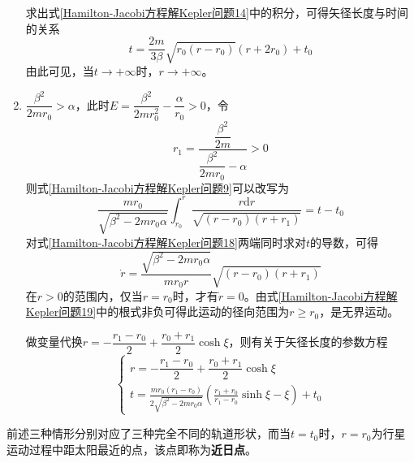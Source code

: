 \begin{enumerate}
求出式\eqref{Hamilton-Jacobi方程解Kepler问题14}中的积分，可得矢径长度与时间的关系
\begin{equation}
	t = \frac{2m}{3\beta}\sqrt{r_0(r-r_0)}(r+2r_0) + t_0
	\label{Hamilton-Jacobi方程解Kepler问题16}
\end{equation}
由此可见，当$t\to +\infty$时，$r\to +\infty$。

\item $\dfrac{\beta^2}{2mr_0}>\alpha$，此时$E = \dfrac{\beta^2}{2mr_0^2}-\dfrac{\alpha}{r_0}>0$，令
\begin{equation}
	r_1 = \dfrac{\dfrac{\beta^2}{2m}}{\dfrac{\beta^2}{2mr_0}-\alpha} > 0
	\label{Hamilton-Jacobi方程解Kepler问题17}
\end{equation}
则式\eqref{Hamilton-Jacobi方程解Kepler问题9}可以改写为
\begin{equation}
	\frac{mr_0}{\sqrt{\beta^2-2mr_0\alpha}} \int_{r_0}^r \frac{r\mathrm{d}r}{\sqrt{(r-r_0)(r+r_1)}} = t-t_0
	\label{Hamilton-Jacobi方程解Kepler问题18}
\end{equation}
对式\eqref{Hamilton-Jacobi方程解Kepler问题18}两端同时求对$t$的导数，可得
\begin{equation}
	\dot{r} = \frac{\sqrt{\beta^2-2mr_0\alpha}}{mr_0r} \sqrt{(r-r_0)(r+r_1)}
	\label{Hamilton-Jacobi方程解Kepler问题19}
\end{equation}
在$r>0$的范围内，仅当$r=r_0$时，才有$\dot{r}=0$。由式\eqref{Hamilton-Jacobi方程解Kepler问题19}中的根式非负可得此运动的径向范围为$r\geqslant r_0$，是无界运动。

做变量代换$r=-\dfrac{r_1-r_0}{2}+\dfrac{r_0+r_1}{2}\cosh\xi$，则有关于矢径长度的参数方程
\begin{equation}
\begin{cases}
	\displaystyle r = -\dfrac{r_1-r_0}{2}+\dfrac{r_0+r_1}{2}\cosh\xi \\
	\displaystyle t = \frac{mr_0(r_1-r_0)}{2\sqrt{\beta^2-2mr_0\alpha}} \left(\frac{r_1+r_0}{r_1-r_0}\sinh \xi-\xi\right) + t_0
\end{cases}
\label{Hamilton-Jacobi方程解Kepler问题20}
\end{equation}
\end{enumerate}

前述三种情形分别对应了三种完全不同的轨道形状，而当$t=t_0$时，$r=r_0$为行星运动过程中距太阳最近的点，该点即称为{\bf 近日点}。

